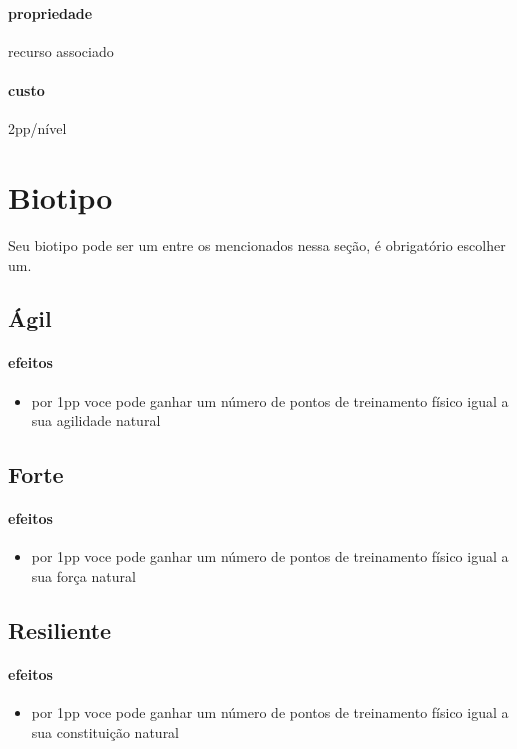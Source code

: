 \paragraph{propriedade} recurso associado
\paragraph{custo} 2pp/nível
\section{Biotipo}
Seu biotipo pode ser um entre os mencionados nessa seção, é obrigatório escolher um.
\subsection{Ágil}
\paragraph{efeitos}
\begin{itemize}
  \item por 1pp voce pode ganhar um número de pontos de treinamento físico 
    igual a sua agilidade natural
\end{itemize}
\subsection{Forte}
\paragraph{efeitos}
\begin{itemize}
  \item por 1pp voce pode ganhar um número de pontos de treinamento físico 
    igual a sua força natural
\end{itemize}
\subsection{Resiliente}
\paragraph{efeitos}
\begin{itemize}
  \item por 1pp voce pode ganhar um número de pontos de treinamento físico 
    igual a sua constituição natural
\end{itemize}
%
%
%
%
